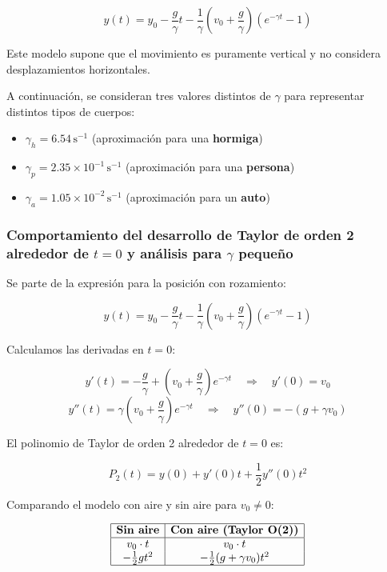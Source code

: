 \documentclass{article}
\begin{document}
\[
y(t) = y_0 - \frac{g}{\gamma} t - \frac{1}{\gamma} \left( v_0 + \frac{g}{\gamma} \right) \left( e^{-\gamma t} - 1 \right)
\]

Este modelo supone que el movimiento es puramente vertical y no considera desplazamientos horizontales.

A continuación, se consideran tres valores distintos de \( \gamma \) para representar distintos tipos de cuerpos:

\begin{itemize}
    \item \( \gamma_h = 6.54\, \text{s}^{-1} \) (aproximación para una \textbf{hormiga})
    \item \( \gamma_p = 2.35 \times 10^{-1}\, \text{s}^{-1} \) (aproximación para una \textbf{persona})
    \item \( \gamma_a = 1.05 \times 10^{-2}\, \text{s}^{-1} \) (aproximación para un \textbf{auto})
\end{itemize}

\subsubsection{Comportamiento del desarrollo de Taylor de orden 2 alrededor de \( t = 0 \) y análisis para \( \gamma \) pequeño}

Se parte de la expresión para la posición con rozamiento:

\[
y(t) = y_0 - \frac{g}{\gamma} t - \frac{1}{\gamma} \left( v_0 + \frac{g}{\gamma} \right)(e^{-\gamma t} - 1)
\]

Calculamos las derivadas en \( t = 0 \):

\[
y'(t) = -\frac{g}{\gamma} + \left( v_0 + \frac{g}{\gamma} \right) e^{-\gamma t} \quad \Rightarrow \quad y'(0) = v_0
\]
\[
y''(t) = \gamma \left( v_0 + \frac{g}{\gamma} \right) e^{-\gamma t} \quad \Rightarrow \quad y''(0) = - (g + \gamma v_0)
\]

El polinomio de Taylor de orden 2 alrededor de \( t = 0 \) es:

\[
P_2(t) = y(0) + y'(0)t + \frac{1}{2} y''(0)t^2
\]

\noindent Comparando el modelo con aire y sin aire para \( v_0 \neq 0 \):

\[
\begin{array}{|c|c|}
\hline
\textbf{Sin aire} & \textbf{Con aire (Taylor O(2))} \\
\hline
v_0 \cdot t & v_0 \cdot t \\
-\frac{1}{2} g t^2 & -\frac{1}{2} (g + \gamma v_0) t^2 \\
\hline
\end{array}
\]
\end{document}
